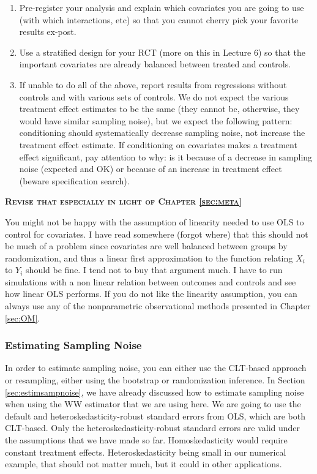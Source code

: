\documentclass[]{book}
\providecommand{\tightlist}{%
  \setlength{\itemsep}{0pt}\setlength{\parskip}{0pt}}
\theoremstyle{definition}
\theoremstyle{definition}
\theoremstyle{definition}
\theoremstyle{remark}
\let\BeginKnitrBlock\begin \let\EndKnitrBlock\end
\begin{document}
\begin{enumerate}
\def\labelenumi{\arabic{enumi}.}
\tightlist
\item
  Pre-register your analysis and explain which covariates you are going
  to use (with which interactions, etc) so that you cannot cherry pick
  your favorite results ex-post.
\item
  Use a stratified design for your RCT (more on this in Lecture 6) so
  that the important covariates are already balanced between treated and
  controls.
\item
  If unable to do all of the above, report results from regressions
  without controls and with various sets of controls. We do not expect
  the various treatment effect estimates to be the same (they cannot be,
  otherwise, they would have similar sampling noise), but we expect the
  following pattern: conditioning should systematically decrease
  sampling noise, not increase the treatment effect estimate. If
  conditioning on covariates makes a treatment effect significant, pay
  attention to why: is it because of a decrease in sampling noise
  (expected and OK) or because of an increase in treatment effect
  (beware specification search).
\end{enumerate}

\textbf{\textsc{Revise that especially in light of Chapter
\ref{sec:meta}}}

\BeginKnitrBlock{remark}
\iffalse{} {Remark. } \fi{}You might not be happy with the assumption of
linearity needed to use OLS to control for covariates. I have read
somewhere (forgot where) that this should not be much of a problem since
covariates are well balanced between groups by randomization, and thus a
linear first approximation to the function relating \(X_i\) to \(Y_i\)
should be fine. I tend not to buy that argument much. I have to run
simulations with a non linear relation between outcomes and controls and
see how linear OLS performs. If you do not like the linearity
assumption, you can always use any of the nonparametric observational
methods presented in Chapter \ref{sec:OM}.
\EndKnitrBlock{remark}

\subsubsection{Estimating Sampling
Noise}\label{estimating-sampling-noise}

In order to estimate sampling noise, you can either use the CLT-based
approach or resampling, either using the bootstrap or randomization
inference. In Section \ref{sec:estimsampnoise}, we have already
discussed how to estimate sampling noise when using the WW estimator
that we are using here. We are going to use the default and
heteroskedasticity-robust standard errors from OLS, which are both
CLT-based. Only the heteroskedasticity-robust standard errors are valid
under the assumptions that we have made so far. Homoskedasticity would
require constant treatment effects. Heteroskedasticity being small in
our numerical example, that should not matter much, but it could in
other applications.
\end{document}
